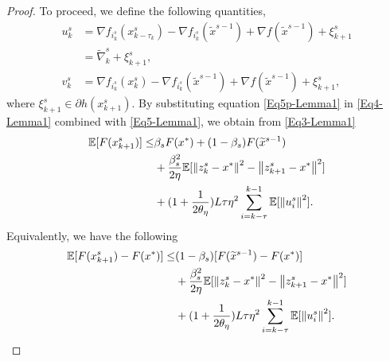 \begin{proof}
To proceed, we define the following quantities,
\begin{equation*}
\begin{split}
u_k^s &= \nabla f_{i_k^s}(x_{k-\tau_k}^s) - \nabla f_{i_k^s}(\widetilde{x}^{s-1}) + \nabla f(\widetilde{x}^{s-1})+{\xi}_{k+1}^s \\
&= {\widetilde{\nabla}_{k}^s}+{\xi}_{k+1}^s,\\
v_k^s &= \nabla f_{i_k^s}(x_{k}^s) - \nabla f_{i_k^s}(\widetilde{x}^{s-1}) + \nabla f(\widetilde{x}^{s-1})+{\xi}_{k+1}^s,
\end{split}
\end{equation*}
where ${\xi}_{k+1}^s\in\partial h(x_{k+1}^s)$. By substituting equation \eqref{Eq5p-Lemma1} in \eqref{Eq4-Lemma1} combined with \eqref{Eq5-Lemma1}, we obtain from \eqref{Eq3-Lemma1}
\begin{equation}
\begin{split}
\mathbb{E}[F(x_{k+1}^s)] \leq &\beta_s F(x^*)+(1-\beta_s)F(\widetilde{x}^{s-1})\\
&+ {\frac{\beta_s^2}{2\eta}}\mathbb{E}[\left\lVert z_{k}^s-x^*\right\rVert^2-\left\lVert z_{k+1}^s-x^*\right\rVert^2]\\
&+(1+\frac{1}{2\theta_{\eta}})L\tau\eta^2\sum_{i = k-\tau}^{k-1}\mathbb{E}[\left\lVert u_{i}^s\right\rVert^2]. 
\end{split}
\end{equation}
Equivalently, we have the following
\begin{equation}\label{main-ine-Lemma1}
\begin{split}
\mathbb{E}[F(x_{k+1}^s)-F(x^*)] \leq &(1-\beta_s)[F(\widetilde{x}^{s-1})-F(x^*)] \\
&+ {\frac{ \beta_s^2}{2\eta}}\mathbb{E}[\left\lVert z_{k}^s-x^*\right\rVert^2-\left\lVert z_{k+1}^s-x^*\right\rVert^2]\\
&+(1+\frac{1}{2\theta_{\eta}})L\tau\eta^2\sum_{i = k-\tau}^{k-1}\mathbb{E}[\left\lVert u_{i}^s\right\rVert^2]. 
\end{split}
\end{equation}


\end{proof}
